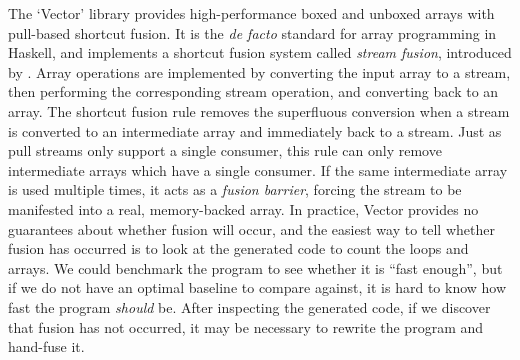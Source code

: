 The `Vector' library provides high-performance boxed and unboxed arrays with pull-based shortcut fusion.
It is the \emph{de facto} standard for array programming in Haskell, and implements a shortcut fusion system called \emph{stream fusion}, introduced by \citet{coutts2007stream}.
Array operations are implemented by converting the input array to a stream, then performing the corresponding stream operation, and converting back to an array.
The shortcut fusion rule removes the superfluous conversion when a stream is converted to an intermediate array and immediately back to a stream.
Just as pull streams only support a single consumer, this rule can only remove intermediate arrays which have a single consumer.
If the same intermediate array is used multiple times, it acts as a \emph{fusion barrier}, forcing the stream to be manifested into a real, memory-backed array.
In practice, Vector provides no guarantees about whether fusion will occur, and the easiest way to tell whether fusion has occurred is to look at the generated code to count the loops and arrays.
We could benchmark the program to see whether it is ``fast enough'', but if we do not have an optimal baseline to compare against, it is hard to know how fast the program \emph{should} be.
After inspecting the generated code, if we discover that fusion has not occurred, it may be necessary to rewrite the program and hand-fuse it.



